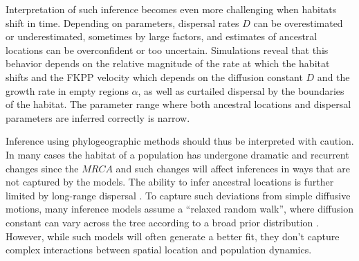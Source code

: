 \documentclass[aps,rmp, twocolumn]{revtex4}
\begin{document}
Interpretation of such inference becomes even more challenging when habitats shift in time.
Depending on parameters, dispersal rates $D$ can be overestimated or underestimated, sometimes by large factors, and estimates of ancestral locations can be overconfident or too uncertain.
Simulations reveal that this behavior depends on the relative magnitude of the rate at which the habitat shifts and the FKPP velocity which depends on the diffusion constant $D$ and the growth rate in empty regions $\alpha$, as well as curtailed dispersal by the boundaries of the habitat.
The parameter range where both ancestral locations and dispersal parameters are inferred correctly is narrow.

Inference using phylogeographic methods should thus be interpreted with caution.
In many cases the habitat of a population has undergone dramatic and recurrent changes since the $MRCA$ and such changes will affect inferences in ways that are not captured by the models.
The ability to infer ancestral locations is further limited by long-range dispersal \citep{hallatschek_acceleration_2014}.
To capture such deviations from simple diffusive motions, many inference models assume a ``relaxed random walk'', where diffusion constant can vary across the tree according to a broad prior distribution \citep{dellicour_relax_2021}.
However, while such models will often generate a better fit, they don't capture complex interactions between spatial location and population dynamics.



\end{document}
